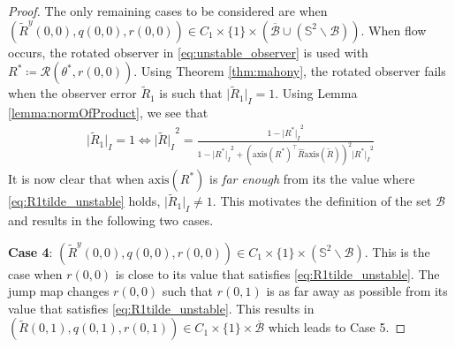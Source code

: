 \documentclass{article}
\newcommand{\axis}[1]{\text{axis}(#1)}
\newcommand{\brackets}[1]{\left(#1\right)}
\newcommand{\Rtilde}{\tilde{R}}
\newcommand{\normSOthree}[1]{{{\vert}#1 {\vert}_I}}
\newcommand{\Rstar}{{R^*}}
\begin{document}
\begin{proof}
    The only remaining cases to be considered are when $(\Rtilde^y(0,0), q(0,0), r(0,0))\in C_1\times\{1\}\times (\overline{\mathcal{B}} \cup (\mathbb{S}^2\backslash \mathcal{B}))$. When flow occurs, the rotated observer in \eqref{eq:unstable_observer} is used with $\Rstar\coloneqq \mathcal{R}(\theta^*, r(0,0))$. Using Theorem \ref{thm:mahony}, the rotated observer fails when the observer error $\Rtilde_1$ is such that $\normSOthree{\Rtilde_1}=1$. Using Lemma \ref{lemma:normOfProduct}, we see that 
    \begin{align}
        \normSOthree{{\Rtilde_1}} = 1 \iff \normSOthree{\Rtilde}^2 = \frac{1 - \normSOthree{\Rstar}^2}{1 - \normSOthree{\Rstar}^2 + \brackets{\axis{\Rstar}^\top\hat{R}\axis{\Rtilde}}^2\normSOthree{\Rstar}^2} \label{eq:R1tilde_unstable}
    \end{align}
    It is now clear that when $\axis{\Rstar}$ is \emph{far enough} from its the value where \eqref{eq:R1tilde_unstable} holds,  $\normSOthree{\Rtilde_1}\neq 1$. This motivates the definition of the set $\mathcal{B}$ and results in the following two cases.

\textbf{Case 4}: ${(\Rtilde^y(0,0), q(0,0), r(0,0))}\in C_1\times\{1\}\times (\mathbb{S}^2\backslash \mathcal{B})$. This is the case when $r(0,0)$ is close to its value that satisfies \eqref{eq:R1tilde_unstable}. The jump map changes $r(0,0)$ such that $r(0,1)$ is as far away as possible from its value that satisfies \eqref{eq:R1tilde_unstable}. This results in $(\Rtilde(0,1), q(0,1), r(0,1))\in C_1\times \{1\}\times \overline{\mathcal{B}}$ which leads to Case 5. 


\end{proof}
\end{document}
